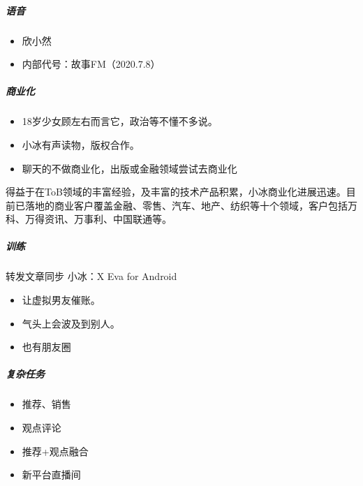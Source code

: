 \documentclass[letterpaper,11pt,english]{sphinxmanual}
\begin{document}
\begin{center}
{{\subparagraph{语音}
\label{\detokenize{chapter_company/xiaoice:id14}}\begin{itemize}
\item {} 
欣小然

\item {} 
内部代号：故事FM（2020.7.8）

\end{itemize}


\subparagraph{商业化}
\label{\detokenize{chapter_company/xiaoice:id15}}\begin{itemize}
\item {} 
18岁少女顾左右而言它，政治等不懂不多说。

\item {} 
小冰有声读物，版权合作。

\item {} 
聊天的不做商业化，出版或金融领域尝试去商业化
%
\begin{footnote}[942]\sphinxAtStartFootnote
{}
%
\end{footnote}

\end{itemize}

得益于在ToB领域的丰富经验，及丰富的技术产品积累，小冰商业化进展迅速。目前已落地的商业客户覆盖金融、零售、汽车、地产、纺织等十个领域，客户包括万科、万得资讯、万事利、中国联通等。


\subparagraph{训练}
\label{\detokenize{chapter_company/xiaoice:id16}}
\sphinxhyphen{}转发文章同步 \sphinxhyphen{}小冰：X Eva for Android
\begin{itemize}
\item {} 
让虚拟男友催账。

\item {} 
气头上会波及到别人。

\item {} 
也有朋友圈

\end{itemize}


\subparagraph{复杂任务}
\label{\detokenize{chapter_company/xiaoice:id17}}\begin{itemize}
\item {} 
推荐、销售

\item {} 
观点评论

\item {} 
推荐+观点融合

\item {} 
新平台直播间


\end{itemize}}}
\end{center}
\end{document}
